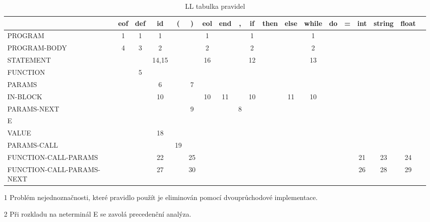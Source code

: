 \documentclass[12pt, a4paper]{article}
\begin{document}
\begin{landscape}
	\begin{table}
		\begin{center}
		\caption{LL tabulka pravidel} \label{LL-table}
		\begin{threeparttable}
			\begin{tabular}{|l|c|c|c|c|c|c|c|c|c|c|c|c|c|c|c|c|c|c|}
	 		\hline	  
	 			& eof & def & id & ( & ) &  eol & end & , & if & then & else & while & do & = & int & string &  float & \textdollar \\
	 			\hline
	 			PROGRAM & 1 & 1 & 1 & & & 1 & & & 1 & & & 1 & & & & & &	\\
	 			\hline
	 			PROGRAM-BODY & 4 & 3 & 2 & & & 2 & & & 2 & & & 2 & & & & & & \\
	 			\hline
	 			STATEMENT & & & 14,15 \tnote{1} & & & 16 & & &  12 & & & 13 & & & & & & \\
	 			\hline
	 			FUNCTION & & 5 & & & & & & & & & & & & & & & &\\
	 			\hline
	 			PARAMS & & & 6 & & 7 & & & & & & & & & & & & & \\
	 			\hline
	 			IN-BLOCK & & & 10 & & & 10 & 11 & & 10 & & 11 & 10 & & & & & & \\
	 			\hline
	 			PARAMS-NEXT  & & & & & 9 & & & 8 & & & & & & & & &  & \\
	 			\hline 
	 			E \tnote{2} & & &  & & & & & & & & & & & & & & &\\
	 			\hline
	 			VALUE & & & 18 & & & & & & & & & & & & & & & \\
	 			\hline
	 			PARAMS-CALL & & & & 19 & & & & & & & & & & & & & & \\ 
	 			\hline
	 			FUNCTION-CALL-PARAMS & & & 22 & & 25 & & & & & & & & & & 21 & 23 & 24 & \\			\hline
	 			FUNCTION-CALL-PARAMS-NEXT & & & 27 & & 30 & & & & & & & & & & 26 & 28 & 29 & \\
	 			\hline
	 		\end{tabular}
	 		\begin{tablenotes}
     		\item[1] Problém nejednoznačnosti, které pravidlo použít je eliminován pomocí dvouprůchodové implementace.
     		\item[2] Při rozkladu na neterminál E se zavolá precedenční analýza.
			\end{tablenotes}
			\end{threeparttable}
	 	\end{center}
	\end{table}
\end{landscape}
\end{document}
